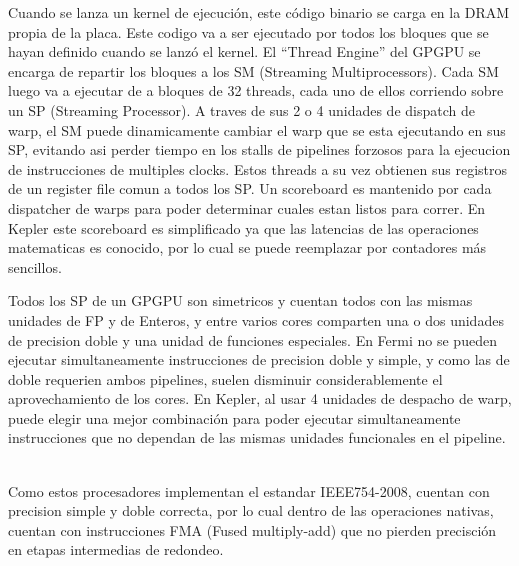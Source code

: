 Cuando se lanza un kernel de ejecuci\'on, este c\'odigo binario se carga en la DRAM propia
de la placa. Este codigo va a ser ejecutado por todos los bloques que se hayan definido cuando
se lanz\'o el kernel. El ``Thread Engine'' del GPGPU se encarga de repartir los bloques a los
SM (Streaming Multiprocessors). Cada SM luego va a ejecutar de a bloques de 32 threads, cada uno
de ellos corriendo sobre un SP (Streaming Processor). A traves de sus 2 o 4 unidades de dispatch de warp,
el SM puede dinamicamente cambiar el warp que se esta ejecutando en sus SP, evitando asi
perder tiempo en los stalls de pipelines forzosos para la ejecucion de instrucciones de multiples clocks.
Estos threads a su vez obtienen sus registros de un register file comun a todos los SP. Un scoreboard
es mantenido por cada dispatcher de warps para poder determinar cuales estan listos para correr. En Kepler
este scoreboard es simplificado ya que las latencias de las operaciones matematicas es conocido, por
lo cual se puede reemplazar por contadores m\'as sencillos. ~\cite{NvidiaKepler}

Todos los SP de un GPGPU son simetricos y cuentan todos con las mismas unidades de FP y de Enteros,
y entre varios cores comparten una o dos unidades de precision doble y una unidad de funciones especiales.
En Fermi no se pueden ejecutar simultaneamente instrucciones de precision doble y simple, y como
las de doble requerien ambos pipelines, suelen disminuir considerablemente el aprovechamiento
de los cores. En Kepler, al usar 4 unidades de despacho de warp, puede elegir una mejor
combinaci\'on para poder ejecutar simultaneamente instrucciones que no dependan de las mismas
unidades funcionales en el pipeline. ~\cite{NvidiaKepler}

Como estos procesadores implementan el estandar IEEE754-2008, cuentan con precision simple y
doble correcta, por lo cual dentro de las operaciones nativas, cuentan con instrucciones FMA
(Fused multiply-add) que no pierden precisci\'on en etapas intermedias de redondeo.


